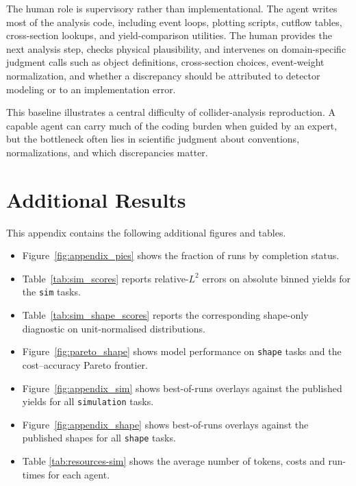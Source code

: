\documentclass{article}
\begin{document}
The human role is supervisory rather than implementational. The agent writes most of the analysis code, including event loops, plotting scripts, cutflow tables, cross-section lookups, and yield-comparison utilities. The human provides the next analysis step, checks physical plausibility, and intervenes on domain-specific judgment calls such as object definitions, cross-section choices, event-weight normalization, and whether a discrepancy should be attributed to detector modeling or to an implementation error.

This baseline illustrates a central difficulty of collider-analysis reproduction. A capable agent can carry much of the coding burden when guided by an expert, but the bottleneck often lies in scientific judgment about conventions, normalizations, and which discrepancies matter.

\section{Additional Results}
\label{app:additional-results}

This appendix contains the following additional figures and tables.

\begin{itemize}
    \item Figure~\ref{fig:appendix_pies} shows the fraction of runs by completion status.
    \item Table~\ref{tab:sim_scores} reports relative-\(L^2\) errors on absolute binned yields for the \texttt{sim} tasks.
    \item Table~\ref{tab:sim_shape_scores} reports the corresponding shape-only diagnostic on unit-normalised distributions.
    \item Figure~\ref{fig:pareto_shape} shows model performance on \texttt{shape} tasks and the cost--accuracy Pareto frontier.
    \item Figure~\ref{fig:appendix_sim} shows best-of-runs overlays against the published yields for all \texttt{simulation} tasks.
    \item Figure~\ref{fig:appendix_shape} shows best-of-runs overlays against the published shapes for all \texttt{shape} tasks.
    \item Table \ref{tab:resources-sim} shows the average number of tokens, costs and run-times for each agent.
\end{itemize}
\end{document}

